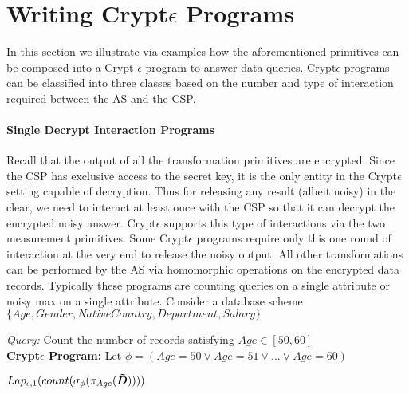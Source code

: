 \section{Writing Crypt$\epsilon$ Programs}\label{program}
In this section we illustrate via examples how the aforementioned primitives can be composed into a Crypt $\epsilon$ program to answer data queries.
Crypt$\epsilon$ programs can be classified into three classes based on the number and type of interaction required between the \textsf{AS} and the \textsf{CSP}.
\paragraph{\textbf{Single Decrypt Interaction Programs}}
Recall that the output of all the transformation primitives are encrypted.  Since  the \textsf{CSP} has exclusive access to the secret key, it is the only entity in the Crypt$\epsilon$ setting capable of decryption. Thus for releasing any result (albeit noisy) in the clear, we need to interact at least once with the \textsf{CSP} so that it can decrypt the encrypted noisy answer. Crypt$\epsilon$ supports this type of interactions via the two measurement primitives. Some Crypt$\epsilon$ programs require only this one round of interaction at the very end to release the noisy output. All other transformations can be performed by the \textsf{AS} via homomorphic operations on the encrypted data records. Typically these programs are counting queries on a single attribute or noisy max on a single attribute. 
Consider a database scheme $\{Age, Gender, NativeCountry, Department, Salary\}$ %
\begin{exmp}
\textit{Query: } Count the number of records satisfying $Age \in [50,60]$\\
\textbf{Crypt$\epsilon$ Program:}
Let $\phi=(Age=50 \vee Age=51 \vee ... \vee Age=60)$ \end{exmp} $Lap_{\epsilon,1}(count(\sigma_{\phi}(\pi_{Age}(\boldsymbol{\tilde{D}}))))$
